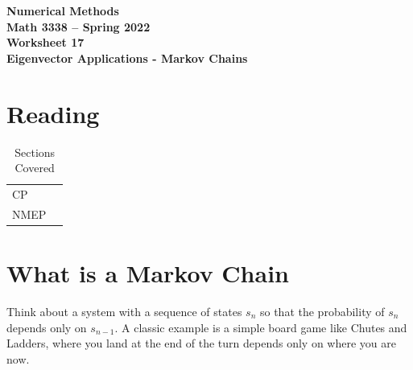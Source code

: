 \documentclass[11pt,letterpaper]{article}
\newcommand{\semester}{Spring 2022}
\begin{document}
\begin{center}
{\huge{\bf  Numerical Methods}} \\[1.5ex]
{\bf Math 3338 -- \semester}\\[1.5ex]
{\Large{\bf Worksheet 17\ \\[2ex] Eigenvector Applications - Markov Chains}}\\
\end{center}
\vspace{2mm}



\section{Reading}

\begin{table}[!ht]
 \centering
 \begin{tabular}{ll}
   CP &   \\
 NMEP &  
 \end{tabular}
\caption{Sections Covered}
\end{table}


\section{What is a Markov Chain}
Think about a system with a sequence of states $s_n$ so that the probability of $s_n$ depends only on $s_{n-1}$. A classic example is a simple board game like Chutes and Ladders, where you land at the end of the turn depends only on where you are now. 
\end{document}
